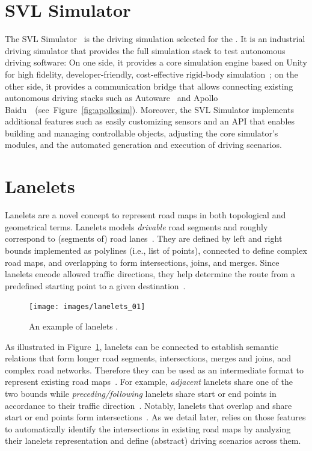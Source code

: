 \documentclass[conference]{IEEEtran}
\begin{document}
\section{SVL Simulator}
\label{subsect:lgsvl}
The SVL Simulator~\cite{rong2020lgsvl} is the driving simulation selected for the \challenge.
It is an industrial driving simulator that provides the full simulation stack to test autonomous driving software: On one side, it provides a core simulation engine based on Unity for high fidelity, developer-friendly, cost-effective rigid-body simulation~\cite{craighead2008using}; on the other side, it provides a communication bridge that allows connecting existing autonomous driving stacks such as Autoware~\cite{DBLP:journals/micro/KatoTINTH15} and Apollo Baidu~\cite{apollo}~(see~Figure~\ref{fig:apollosim}). 
Moreover, the SVL Simulator implements additional features such as easily customizing sensors and an API that enables building and managing controllable objects, adjusting the core simulator's modules, and the automated generation and execution of driving scenarios.


\section{Lanelets}
\label{subsect:lanelets}
Lanelets are a novel concept to represent road maps in both topological and geometrical terms. Lanelets models \emph{drivable} road segments and roughly correspond to (segments of) road lanes~\cite{bender2014lanelets}. They are defined by left and right bounds implemented as polylines (i.e., list of points), connected to define complex road maps, and overlapping to form intersections, joins, and merges. Since lanelets encode allowed traffic directions, they help determine the route from a predefined starting point to a given destination~\cite{PekIV20}.

\begin{figure}[tp]
  \centering
    \texttt{[image: images/lanelets\_01]}
  \caption{An example of lanelets \cite{althoff2018automatic}.}
  \label{fig:lanelets}
\end{figure}

As illustrated in Figure~\ref{fig:lanelets}, lanelets can be connected to establish semantic relations that form longer road segments, intersections, merges and joins, and complex road networks. Therefore
they can be used as an intermediate format to represent existing road maps~\cite{althoff2018automatic}. For example, \emph{adjacent} lanelets share one of the two bounds while \emph{preceding/following} lanelets share start or end points in accordance to their traffic direction~\cite{althoff2018automatic}. Notably, lanelets that overlap and share start or end points form intersections~\cite{Althoff2017a}.
%
As we detail later, \tool relies on those features to automatically identify the intersections in existing road maps by analyzing their lanelets representation and define (abstract) driving scenarios across them.
\end{document}

